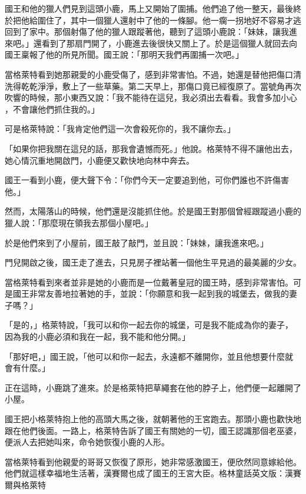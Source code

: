\documentclass[oneside,11pt]{memoir} %
\begin{document}
國王和他的獵人們見到這頭小鹿，馬上又開始了圍捕。他們追了他一整天，最後終
於把他給圍住了，其中一個獵人還射中了他的一條腳。他一瘸一拐地好不容易才逃
回到了家中。那個射傷了他的獵人跟蹤著他，聽到了這頭小鹿說：「妹妹，讓我進
來吧。」還看到了那扇門開了，小鹿進去後很快又關上了。於是這個獵人就回去向
國王稟報了他的所見所聞。國王說：「那明天我們再圍捕一次吧。」

當格萊特看到她那親愛的小鹿受傷了，感到非常害怕。不過，她還是替他把傷口清
洗得乾乾淨淨，敷上了一些草藥。第二天早上，那傷口竟已經復原了。當號角再次
吹響的時候，那小東西又說：「我不能待在這兒，我必須出去看看。我會多加小心
，不會讓他們抓住我的。」

可是格萊特說：「我肯定他們這一次會殺死你的，我不讓你去。」

「如果你把我關在這兒的話，那我會遺憾而死。」他說。格萊特不得不讓他出去，
她心情沉重地開啟門，小鹿便又歡快地向林中奔去。

國王一看到小鹿，便大聲下令：「你們今天一定要追到他，可你們誰也不許傷害他。」

然而，太陽落山的時候，他們還是沒能抓住他。於是國王對那個曾經跟蹤過小鹿的
獵人說：「那麼現在領我去那個小屋吧。」

於是他們來到了小屋前，國王敲了敲門，並且說：「妹妹，讓我進來吧。」

門兒開啟之後，國王走了進去，只見房子裡站著一個他生平見過的最美麗的少女。

當格萊特看到來者並非是她的小鹿而是一位戴著皇冠的國王時，感到非常害怕。可
是國王非常友善地拉著她的手，並說：「你願意和我一起到我的城堡去，做我的妻
子嗎？」

「是的，」格萊特說，「我可以和你一起去你的城堡，可是我不能成為你的妻子，
因為我的小鹿必須和我在一起，我不能和他分開。」

「那好吧，」國王說，「他可以和你一起去，永遠都不離開你，並且他想要什麼就
會有什麼。」

正在這時，小鹿跳了進來。於是格萊特把草繩套在他的脖子上，他們便一起離開了小屋。

國王把小格萊特抱上他的高頭大馬之後，就朝著他的王宮跑去。那頭小鹿也歡快地
跟在他們後面。一路上，格萊特告訴了國王有關她的一切，國王認識那個老巫婆，
便派人去把她叫來，命令她恢復小鹿的人形。

當格萊特看到他親愛的哥哥又恢復了原形，她非常感激國王，便欣然同意嫁給他。
他們就這樣幸福地生活著，漢賽爾也成了國王的王宮大臣。格林童話英文版：漢賽
爾與格萊特

\end{document}

